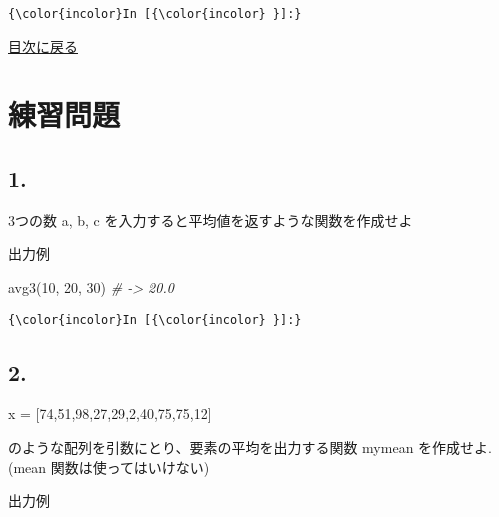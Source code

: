 \documentclass[a4paper,dvipdfmx,uplatex]{jsarticle}
\newenvironment{Shaded}{}{}
\newcommand{\FloatTok}[1]{\textcolor[rgb]{0.25,0.63,0.44}{{#1}}}
\newcommand{\CommentTok}[1]{\textcolor[rgb]{0.38,0.63,0.69}{\textit{{#1}}}}
\newcommand{\NormalTok}[1]{{#1}}
\begin{document}
    \begin{Verbatim}[commandchars=\\\{\}]
{\color{incolor}In [{\color{incolor} }]:} 
\end{Verbatim}

    \protect\hyperlink{ux76eeux6b21}{目次に戻る}

    \section{練習問題}\label{ux7df4ux7fd2ux554fux984c}

    \subsection{1.}\label{section}

3つの数 a, b, c を入力すると平均値を返すような関数を作成せよ

出力例

\begin{Shaded}
\begin{Highlighting}[]
\NormalTok{avg3(}\FloatTok{10}\NormalTok{, }\FloatTok{20}\NormalTok{, }\FloatTok{30}\NormalTok{) }\CommentTok{# -> 20.0}
\end{Highlighting}
\end{Shaded}

    \begin{Verbatim}[commandchars=\\\{\}]
{\color{incolor}In [{\color{incolor} }]:} 
\end{Verbatim}

    \subsection{2.}\label{section}

\begin{Shaded}
\begin{Highlighting}[]
    \NormalTok{x = [}\FloatTok{74}\NormalTok{,}\FloatTok{51}\NormalTok{,}\FloatTok{98}\NormalTok{,}\FloatTok{27}\NormalTok{,}\FloatTok{29}\NormalTok{,}\FloatTok{2}\NormalTok{,}\FloatTok{40}\NormalTok{,}\FloatTok{75}\NormalTok{,}\FloatTok{75}\NormalTok{,}\FloatTok{12}\NormalTok{]}
\end{Highlighting}
\end{Shaded}

のような配列を引数にとり、要素の平均を出力する関数 mymean を作成せよ.
(mean 関数は使ってはいけない)

出力例
\end{document}
